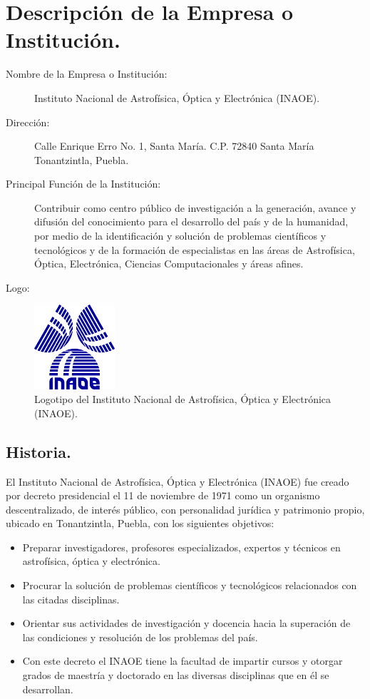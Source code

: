 \section{Descripción de la Empresa o Institución.}
\begin{description}
	\item [Nombre de la Empresa o Institución:] Instituto Nacional de Astrofísica, Óptica y Electrónica (INAOE).
	\item [Dirección:] Calle Enrique Erro No. 1, Santa María. C.P. 72840 Santa María Tonantzintla, Puebla.
	\item [Principal Función de la Institución:] Contribuir como centro público de investigación a la generación, avance y difusión del conocimiento para el desarrollo del país y de la humanidad, por medio de la identificación y solución de problemas científicos y tecnológicos y de la formación de especialistas en las áreas de Astrofísica, Óptica, Electrónica, Ciencias Computacionales y áreas afines.
	\item [Logo: ] 
\end{description}
\begin{figure}[!h]
	\centering
	\includegraphics[width=3cm]{img/inaoe.png}
    \caption{Logotipo del Instituto Nacional de Astrofísica, Óptica y Electrónica (INAOE).}
\end{figure}

\subsection{Historia.}
El Instituto Nacional de Astrofísica, Óptica y Electrónica (INAOE) fue creado por decreto presidencial el 11 de noviembre de 1971 como un organismo descentralizado, de interés público, con personalidad jurídica y patrimonio propio, ubicado en Tonantzintla, Puebla, con los siguientes objetivos:
\begin{itemize}
	\item Preparar investigadores, profesores especializados, expertos y técnicos en astrofísica, óptica y electrónica.
	\item Procurar la solución de problemas científicos y tecnológicos relacionados con las citadas disciplinas.
	\item Orientar sus actividades de investigación y docencia hacia la superación de las condiciones y resolución de los problemas del país.
	\item Con este decreto el INAOE tiene la facultad de impartir cursos y otorgar grados de maestría y doctorado en las diversas disciplinas que en él se desarrollan.
\end{itemize}

